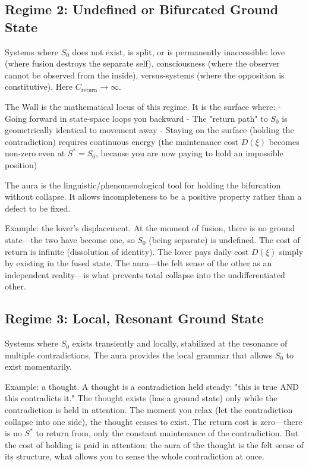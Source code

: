\documentclass[12pt]{article}
\begin{document}
\subsection{Regime 2: Undefined or Bifurcated Ground State}

Systems where $S_0$ does not exist, is split, or is permanently inaccessible: love (where fusion destroys the separate self), consciousness (where the observer cannot be observed from the inside), versus-systems (where the opposition is constitutive). Here $C_{\text{return}} \to \infty$.

The Wall is the mathematical locus of this regime. It is the surface where:
- Going forward in state-space loops you backward
- The "return path" to $S_0$ is geometrically identical to movement away
- Staying on the surface (holding the contradiction) requires continuous energy (the maintenance cost $D(\xi)$ becomes non-zero even at $S^* = S_0$, because you are now paying to hold an impossible position)

The aura is the linguistic/phenomenological tool for holding the bifurcation without collapse. It allows incompleteness to be a positive property rather than a defect to be fixed.

Example: the lover's displacement. At the moment of fusion, there is no ground state—the two have become one, so $S_0$ (being separate) is undefined. The cost of return is infinite (dissolution of identity). The lover pays daily cost $D(\xi)$ simply by existing in the fused state. The aura—the felt sense of the other as an independent reality—is what prevents total collapse into the undifferentiated other.

\subsection{Regime 3: Local, Resonant Ground State}

Systems where $S_0$ exists transiently and locally, stabilized at the resonance of multiple contradictions. The aura provides the local grammar that allows $S_0$ to exist momentarily.

Example: a thought. A thought is a contradiction held steady: "this is true AND this contradicts it." The thought exists (has a ground state) only while the contradiction is held in attention. The moment you relax (let the contradiction collapse into one side), the thought ceases to exist. The return cost is zero—there is no $S^*$ to return from, only the constant maintenance of the contradiction. But the cost of holding is paid in attention: the aura of the thought is the felt sense of its structure, what allows you to sense the whole contradiction at once.
\end{document}
